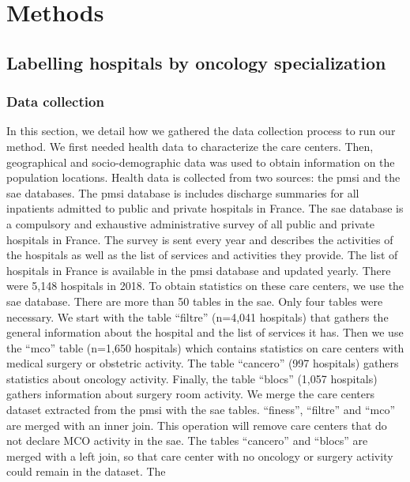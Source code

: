 \section{Methods}

\subsection{Labelling hospitals by oncology specialization}
\label{section:oncology-specialization-cluster}

\subsubsection{Data collection}

In this section, we detail how we gathered the data collection process to run
our method.  We first needed health data to characterize the care centers. Then,
geographical and socio-demographic data was used to obtain information on the
population locations. Health data is collected from two sources: the \ac{pmsi}
and the \ac{sae} databases. The \ac{pmsi} database is includes discharge
summaries for all inpatients admitted to public and private hospitals in France.
The \ac{sae} database is a compulsory and exhaustive administrative survey of
all public and private hospitals in France. The survey is sent every year and
describes the activities of the hospitals as well as the list of services and
activities they provide. The list of hospitals in France is available in the
\ac{pmsi} database and updated yearly. There were 5,148 hospitals in 2018. To
obtain statistics on these care centers, we use the \ac{sae} database. There are
more than 50 tables in the \ac{sae}. Only four tables were necessary. We start
with the table ``filtre'' (n=4,041 hospitals) that gathers the general
information about the hospital and the list of services it has. Then we use the
``mco'' table (n=1,650 hospitals) which contains statistics on care centers with
medical surgery or obstetric activity. The table ``cancero'' (997 hospitals)
gathers statistics about oncology activity. Finally, the table ``blocs'' (1,057
hospitals) gathers information about surgery room activity. We merge the care
centers dataset extracted from the \ac{pmsi} with the \ac{sae} tables.
``finess'', ``filtre'' and ``mco'' are merged with an inner join. This operation
will remove care centers that do not declare MCO activity in the \ac{sae}. The
tables ``cancero'' and ``blocs'' are merged with a left join, so that care
center with no oncology or surgery activity could remain in the dataset. The
